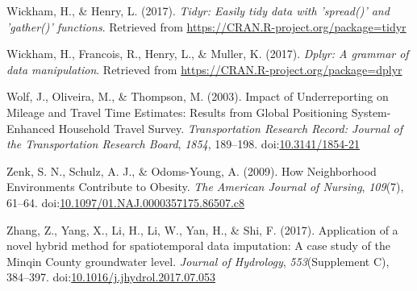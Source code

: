 \documentclass[english,man]{apa6}
\theoremstyle{definition}
\theoremstyle{definition}
\theoremstyle{definition}
\theoremstyle{remark}
\begin{document}
\hypertarget{ref-tidyr}{}
Wickham, H., \& Henry, L. (2017). \emph{Tidyr: Easily tidy data with
'spread()' and 'gather()' functions}. Retrieved from
\url{https://CRAN.R-project.org/package=tidyr}

\hypertarget{ref-dplyr}{}
Wickham, H., Francois, R., Henry, L., \& Muller, K. (2017). \emph{Dplyr:
A grammar of data manipulation}. Retrieved from
\url{https://CRAN.R-project.org/package=dplyr}

\hypertarget{ref-wolf_impact_2003}{}
Wolf, J., Oliveira, M., \& Thompson, M. (2003). Impact of Underreporting
on Mileage and Travel Time Estimates: Results from Global Positioning
System-Enhanced Household Travel Survey. \emph{Transportation Research
Record: Journal of the Transportation Research Board}, \emph{1854},
189--198. doi:\href{https://doi.org/10.3141/1854-21}{10.3141/1854-21}

\hypertarget{ref-zenk_how_2009}{}
Zenk, S. N., Schulz, A. J., \& Odoms-Young, A. (2009). How Neighborhood
Environments Contribute to Obesity. \emph{The American Journal of
Nursing}, \emph{109}(7), 61--64.
doi:\href{https://doi.org/10.1097/01.NAJ.0000357175.86507.c8}{10.1097/01.NAJ.0000357175.86507.c8}

\hypertarget{ref-zhang_application_2017}{}
Zhang, Z., Yang, X., Li, H., Li, W., Yan, H., \& Shi, F. (2017).
Application of a novel hybrid method for spatiotemporal data imputation:
A case study of the Minqin County groundwater level. \emph{Journal of
Hydrology}, \emph{553}(Supplement C), 384--397.
doi:\href{https://doi.org/10.1016/j.jhydrol.2017.07.053}{10.1016/j.jhydrol.2017.07.053}
\end{document}
